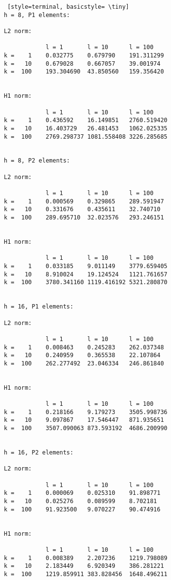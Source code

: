 \documentclass[a4paper,english,12pt,twoside]{article}
\begin{document}
\begin{lstlisting} [style=terminal, basicstyle= \tiny]
h = 8, P1 elements:

L2 norm:

           	l = 1    	l = 10    	l = 100
k =    1	0.032775	0.679790	191.311299
k =   10	0.679028	0.667057	39.001974
k =  100	193.304690	43.850560	159.356420


H1 norm:

           	l = 1    	l = 10    	l = 100
k =    1	0.436592	16.149851	2760.519420
k =   10	16.403729	26.481453	1062.025335
k =  100	2769.298737	1081.558408	3226.285685


h = 8, P2 elements:

L2 norm:

           	l = 1    	l = 10    	l = 100
k =    1	0.000569	0.329865	289.591947
k =   10	0.331676	0.435611	32.740710
k =  100	289.695710	32.023576	293.246151


H1 norm:

           	l = 1    	l = 10    	l = 100
k =    1	0.033185	9.011149	3779.659405
k =   10	8.910024	19.124524	1121.761657
k =  100	3780.341160	1119.416192	5321.280870


h = 16, P1 elements:

L2 norm:

           	l = 1    	l = 10    	l = 100
k =    1	0.008463	0.245283	262.037348
k =   10	0.240959	0.365538	22.107864
k =  100	262.277492	23.046334	246.861840


H1 norm:

           	l = 1    	l = 10    	l = 100
k =    1	0.218166	9.179273	3505.998736
k =   10	9.097867	17.546447	871.935651
k =  100	3507.090063	873.593192	4686.200990


h = 16, P2 elements:

L2 norm:

           	l = 1    	l = 10    	l = 100
k =    1	0.000069	0.025310	91.898771
k =   10	0.025276	0.089599	8.702181
k =  100	91.923500	9.070227	90.474916


H1 norm:

           	l = 1    	l = 10    	l = 100
k =    1	0.008389	2.207236	1219.798089
k =   10	2.183449	6.920349	386.281221
k =  100	1219.859911	383.828456	1648.496211
\end{lstlisting}
\newpage
\end{document}
